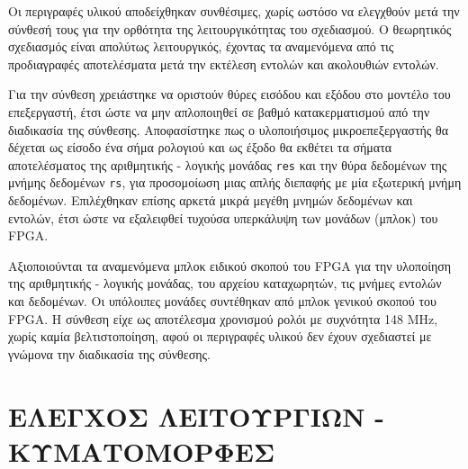 \documentclass[11pt]{extarticle}
\let\stdsection\section
\renewcommand\section{\newpage\stdsection}
\begin{document}
Οι περιγραφές υλικού αποδείχθηκαν συνθέσιμες, χωρίς ωστόσο να ελεγχθούν μετά την σύνθεσή τους για την ορθότητα της λειτουργικότητας του σχεδιασμού.
Ο θεωρητικός σχεδιασμός είναι απολύτως λειτουργικός, έχοντας τα αναμενόμενα από τις προδιαγραφές αποτελέσματα μετά την εκτέλεση εντολών και ακολουθιών εντολών. 

Για την σύνθεση χρειάστηκε να οριστούν θύρες εισόδου και εξόδου στο μοντέλο του επεξεργαστή, έτσι ώστε να μην απλοποιηθεί σε βαθμό κατακερματισμού από την διαδικασία της σύνθεσης.
Αποφασίστηκε πως ο υλοποιήσιμος μικροεπεξεργαστής θα δέχεται ως είσοδο ένα σήμα ρολογιού και ως έξοδο θα εκθέτει τα σήματα αποτελέσματος της αριθμητικής - λογικής μονάδας \texttt{res} και την θύρα δεδομένων της μνήμης δεδομένων \texttt{rs}, για προσομοίωση μιας απλής διεπαφής με μία εξωτερική μνήμη δεδομένων.
Επιλέχθηκαν επίσης αρκετά μικρά μεγέθη μνημών δεδομένων και εντολών, έτσι ώστε να εξαλειφθεί τυχούσα υπερκάλυψη των μονάδων (μπλοκ) του FPGA.

Αξιοποιούνται τα αναμενόμενα μπλοκ ειδικού σκοπού του FPGA για την υλοποίηση της αριθμητικής - λογικής μονάδας, του αρχείου καταχωρητών, τις μνήμες εντολών και δεδομένων.
Οι υπόλοιπες μονάδες συντέθηκαν από μπλοκ γενικού σκοπού του FPGA.
Η σύνθεση είχε ως αποτέλεσμα χρονισμού ρολόι με συχνότητα 148 MHz, χωρίς καμία βελτιστοποίηση, αφού οι περιγραφές υλικού δεν έχουν σχεδιαστεί με γνώμονα την διαδικασία της σύνθεσης.


\section{ΕΛΕΓΧΟΣ ΛΕΙΤΟΥΡΓΙΩΝ - ΚΥΜΑΤΟΜΟΡΦΕΣ}
\end{document}
